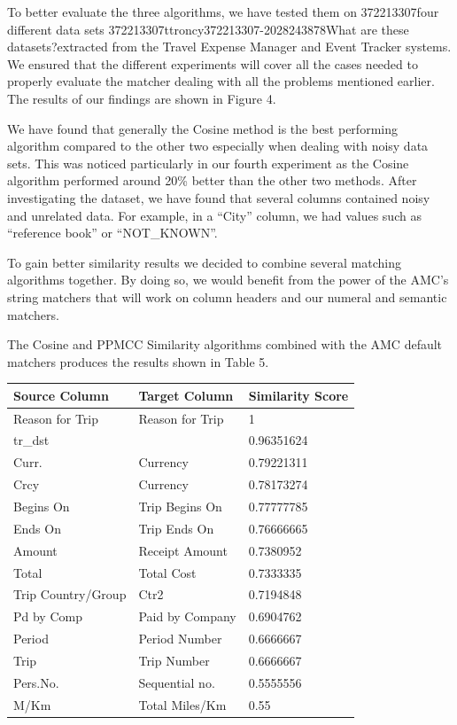 \documentclass{sig-alternate}
\begin{document}
To better evaluate the three algorithms, we have tested them on 372213307four different data sets 372213307ttroncy372213307-2028243878What are these datasets?extracted from the Travel Expense Manager and Event Tracker systems. We ensured that the different experiments will cover all the cases needed to properly evaluate the matcher dealing with all the problems mentioned earlier. The results of our findings are shown in Figure 4.




We have found that generally the Cosine method is the best performing algorithm compared to the other two especially when dealing with noisy data sets. This was noticed particularly in our fourth experiment as the Cosine algorithm performed around 20\% better than the other two methods. After investigating the dataset, we have found that several columns contained noisy and unrelated data. For example, in a ``City'' column, we had values such as ``reference book'' or ``NOT\_KNOWN''.

To gain better similarity results we decided to combine several matching algorithms together. By doing so, we would benefit from the power of the AMC's string matchers that will work on column headers and our numeral and semantic matchers.

The Cosine and PPMCC Similarity algorithms combined with the AMC default matchers produces the results shown in Table 5.



\begin{tabular}{|p{0.7in}|p{0.8in}|p{0.8in}|} \hline
\textbf{Source Column} & \textbf{Target Column} & \textbf{Similarity Score} \\ \hline
Reason for Trip & Reason for Trip & 1 \\ \hline
tr\_dst &  & 0.96351624 \\ \hline
Curr. & Currency & 0.79221311 \\ \hline
Crcy & Currency & 0.78173274 \\ \hline
Begins On & Trip Begins On & 0.77777785 \\ \hline
Ends On & Trip Ends On & 0.76666665 \\ \hline
Amount & Receipt Amount & 0.7380952 \\ \hline
Total & Total Cost & 0.7333335 \\ \hline
Trip Country/Group & Ctr2 & 0.7194848 \\ \hline
Pd by Comp & Paid by Company & 0.6904762 \\ \hline
Period & Period Number & 0.6666667 \\ \hline
Trip & Trip Number & 0.6666667 \\ \hline
Pers.No. & Sequential no. & 0.5555556 \\ \hline
M/Km & Total Miles/Km & 0.55 \\ \hline
\end{tabular}
\end{document}
